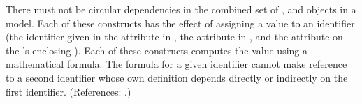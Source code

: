 There must not be circular dependencies in the combined set of
\InitialAssignment, \AssignmentRule and \KineticLaw objects in a model.
Each of these constructs has the effect of assigning a value to an
identifier (\ie the identifier given in the attribute  in
\InitialAssignment, the attribute  in \AssignmentRule, and
the attribute  on the \KineticLaw's enclosing \Reaction).  Each
of these constructs computes the value using a mathematical formula.  The
formula for a given identifier cannot make reference to a second identifier
whose own definition depends directly or indirectly on the first
identifier.  (References: .)
